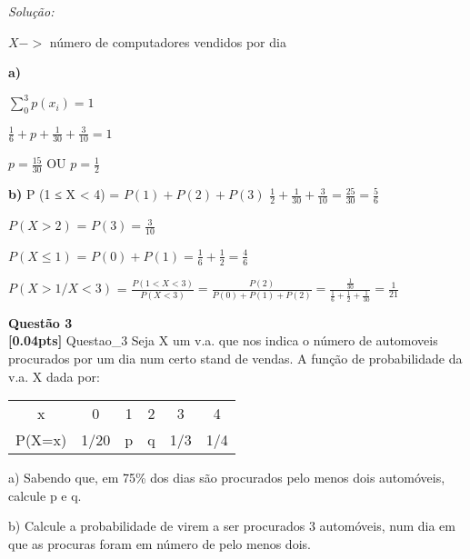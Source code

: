 \documentclass{article}
\newenvironment{problem}[2][Questão]
    { \begin{mdframed}[backgroundcolor=gray!20] \textbf{#1 #2} \\}
    {  \end{mdframed}}
\newenvironment{solution}
    {\textit{Solução:}}
    {}
\begin{document}
\begin{solution}

$X ->$ número de computadores vendidos por dia

\textbf{a)}

$\sum_{0}^{3} p(x_{i}) = 1$

$\frac{1}{6} + p + \frac{1}{30} + \frac{3}{10} = 1$

$p = \frac{15}{30}$ OU $p=\frac{1}{2}$

\hrulefill

\textbf{b)} P (1 ≤ X < 4) = $ P(1) + P(2) + P(3)$
$\frac{1}{2} + \frac{1}{30} + \frac{3}{10} = \frac{25}{30} = \frac{5}{6}$

$P (X > 2)$ = $P(3) = \frac{3}{10}$

$P (X \leq 1)$ = $P(0) + P(1) = \frac{1}{6} + \frac{1}{2} = \frac{4}{6}$

$P (X > 1/ X < 3)$ = $\frac{P(1<X<3)}{P(X<3)} = \frac{P(2)}{P(0)+P(1)+P(2)} = \frac{\frac{1}{30}}{\frac{1}{6}+\frac{1}{2}+\frac{1}{30}} = \frac{1}{21}$



\end{solution}

\begin{problem}{3}
\textbf{[0.04pts]} Questao\_3 Seja X um v.a. que nos indica o número de automoveis procurados por um dia num certo stand de vendas. A função de probabilidade da v.a.  X     dada por:

\begin{center}
\begin{tabular}{ |c|c|c|c|c|c|}
\hline

x &0 & 1 & 2 & 3 & 4 \\ 
P(X=x) & 1/20 & p & q & 1/3 & 1/4 \\

 \hline
\end{tabular}
\end{center}

a) Sabendo que, em 75\% dos dias são procurados pelo menos dois automóveis, calcule p e q. 

b) Calcule a probabilidade de virem a ser procurados 3 automóveis, num dia em que as procuras foram em número de pelo menos  dois.

\end{problem}
\end{document}
